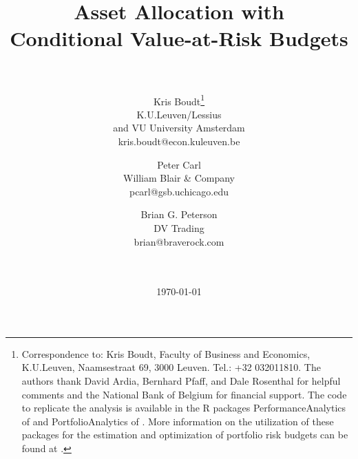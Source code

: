 \documentclass[12pt,a4paper]{article}
\renewcommand{\baselinestretch}{1.3}
\begin{document}
\vspace{-2cm}
\renewcommand{\baselinestretch}{1}
\title{Asset Allocation with \\ Conditional Value-at-Risk Budgets }



\author{
 \\ \\ Kris Boudt\thanks{Correspondence to: Kris Boudt,
Faculty of Business and Economics, K.U.Leuven, Naamsestraat 69, 3000 Leuven. Tel.: +32 032011810. The authors thank David Ardia, Bernhard Pfaff, and Dale Rosenthal for helpful comments and the National Bank of Belgium for financial support. The code to replicate the analysis is available in the R packages PerformanceAnalytics of \citet{PerformanceAnalytics} and PortfolioAnalytics of \citet{PortfolioAnalytics}. More information on the utilization of these packages for the estimation and optimization of portfolio risk budgets can be found at \web.}\\
K.U.Leuven/Lessius \\ and VU University Amsterdam\\
kris.boudt@econ.kuleuven.be  \\  \hspace{14cm}
 \and Peter Carl\\
William Blair \& Company  \\
pcarl@gsb.uchicago.edu\\  \hspace{14cm}
\and Brian G. Peterson\\
DV Trading\\
brian@braverock.com \\ \\ \\ }

\date{\today}

\maketitle
\thispagestyle{empty} %

\newpage
\end{document}

